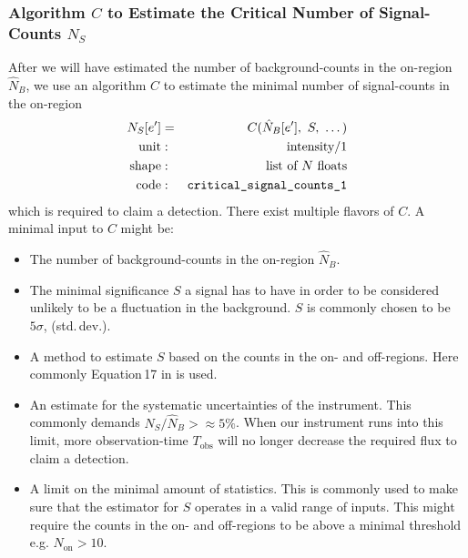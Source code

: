 \documentclass{article}%
\begin{document}
        \subsubsection*{Algorithm $C$ to Estimate the Critical Number of Signal-Counts $N_S$}
            After we will have estimated the number of background-counts in the on-region $\hat{N}_B$, we use an algorithm $C$ to estimate the minimal number of signal-counts in the on-region
            \begin{eqnarray*}
                N_S[e'] &=& C(\hat{N}_B[e'],\,\,S,\,\,\dots)\\
                \text{unit} &:& \text{intensity}/1\\
                \text{shape} &:& \text{list of}\,\,N\,\,\text{floats}\\
                \text{code} &:& \verb|critical_signal_counts_1|
            \end{eqnarray*}
            which is required to claim a detection.
            There exist multiple flavors of $C$.
            A minimal input to $C$ might be:
            \begin{itemize}
                \item{} The number of background-counts in the on-region $\hat{N}_B$.
                \item{} The minimal significance $S$ a signal has to have in order to be considered unlikely to be a fluctuation in the background.
                $S$ is commonly chosen to be $5\sigma$, (std.\,dev.).
                \item{} A method to estimate $S$ based on the counts in the on- and off-regions. Here commonly Equation\,17 in \cite{li1983analysis} is used.
                \item{} An estimate for the systematic uncertainties of the instrument. This commonly demands $N_S/\hat{N}_B >\approx 5\%$.
                When our instrument runs into this limit, more observation-time $T_\text{obs}$ will no longer decrease the required flux to claim a detection.
                \item{}
                A limit on the minimal amount of statistics. This is commonly used to make sure that the estimator for $S$ operates in a valid range of inputs.
                This might require the counts in the on- and off-regions to be above a minimal threshold e.g. $N_\text{on} > 10$.
            \end{itemize}
\end{document}
